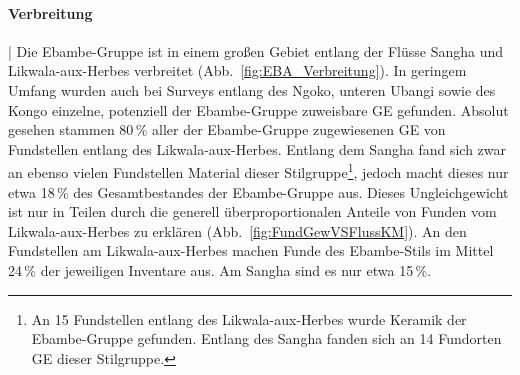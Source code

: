 \paragraph{Verbreitung}\hspace{-.5em}|\hspace{.5em}%
Die Ebambe-Gruppe ist in einem großen Gebiet entlang der Flüsse \mbox{Sangha} und \mbox{Likwala}-\mbox{aux}-\mbox{Herbes} verbreitet (Abb.~\ref{fig:EBA_Verbreitung}). In geringem Umfang wurden auch bei Surveys entlang des \mbox{Ngoko}, unteren \mbox{Ubangi} sowie des Kongo einzelne, potenziell der Ebambe-Gruppe zuweisbare GE gefunden. Absolut gesehen stammen 80\,\% aller der Ebambe-Gruppe zugewiesenen GE von Fundstellen entlang des Likwala-aux-Herbes. Entlang dem \mbox{Sangha} fand sich zwar an ebenso vielen Fundstellen Material dieser Stilgruppe\footnote{An 15 Fundstellen entlang des \mbox{Likwala}-\mbox{aux}-\mbox{Herbes} wurde Keramik der Ebambe-Gruppe gefunden. Entlang des \mbox{Sangha} fanden sich an 14 Fundorten GE dieser Stilgruppe.}, jedoch macht dieses nur etwa 18\,\% des Gesamtbestandes der Ebambe-Gruppe aus. Dieses Ungleichgewicht ist nur in Teilen durch die generell überproportionalen Anteile von Funden vom \mbox{Likwala}-\mbox{aux}-\mbox{Herbes} zu erklären (Abb.~\ref{fig:FundGewVSFlussKM}). An den Fundstellen am \mbox{Likwala}-\mbox{aux}-\mbox{Herbes} machen Funde des Ebambe-Stils im Mittel 24\,\% der jeweiligen Inventare aus. Am \mbox{Sangha} sind es nur etwa 15\,\%.